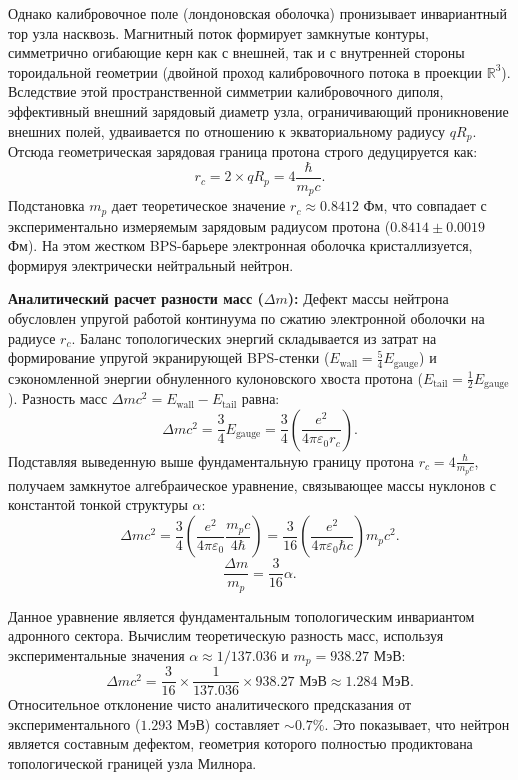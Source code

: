 \documentclass[11pt,a4paper]{article}
\begin{document}
	Однако калибровочное поле (лондоновская оболочка) пронизывает инвариантный тор узла насквозь. Магнитный поток формирует замкнутые контуры, симметрично огибающие керн как с внешней, так и с внутренней стороны тороидальной геометрии (двойной проход калибровочного потока в проекции $\mathbb{R}^3$). Вследствие этой пространственной симметрии калибровочного диполя, эффективный внешний зарядовый диаметр узла, ограничивающий проникновение внешних полей, удваивается по отношению к экваториальному радиусу $q R_p$.
	Отсюда геометрическая зарядовая граница протона строго дедуцируется как:
	\begin{equation}
		r_c = 2 \times q R_p = 4 \frac{\hbar}{m_p c}.
	\end{equation}
	Подстановка $m_p$ дает теоретическое значение $r_c \approx 0.8412$ Фм, что совпадает с экспериментально измеряемым зарядовым радиусом протона ($0.8414 \pm 0.0019$ Фм). На этом жестком BPS-барьере электронная оболочка кристаллизуется, формируя электрически нейтральный нейтрон.
	
	\textbf{Аналитический расчет разности масс ($\Delta m$):}
	Дефект массы нейтрона обусловлен упругой работой континуума по сжатию электронной оболочки на радиусе $r_c$. Баланс топологических энергий складывается из затрат на формирование упругой экранирующей BPS-стенки ($E_{\text{wall}} = \frac{5}{4} E_{\text{gauge}}$) и сэкономленной энергии обнуленного кулоновского хвоста протона ($E_{\text{tail}} = \frac{1}{2} E_{\text{gauge}}$).
	Разность масс $\Delta m c^2 = E_{\text{wall}} - E_{\text{tail}}$ равна:
	\begin{equation}
		\Delta m c^2 = \frac{3}{4} E_{\text{gauge}} = \frac{3}{4} \left( \frac{e^2}{4\pi\varepsilon_0 r_c} \right).
	\end{equation}
	Подставляя выведенную выше фундаментальную границу протона $r_c = 4 \frac{\hbar}{m_p c}$, получаем замкнутое алгебраическое уравнение, связывающее массы нуклонов с константой тонкой структуры $\alpha$:
	\begin{equation}
		\Delta m c^2 = \frac{3}{4} \left( \frac{e^2}{4\pi\varepsilon_0} \frac{m_p c}{4 \hbar} \right) = \frac{3}{16} \left( \frac{e^2}{4\pi\varepsilon_0 \hbar c} \right) m_p c^2.
	\end{equation}
	\begin{equation}
		\frac{\Delta m}{m_p} = \frac{3}{16} \alpha.
	\end{equation}
	
	Данное уравнение является фундаментальным топологическим инвариантом адронного сектора. Вычислим теоретическую разность масс, используя экспериментальные значения $\alpha \approx 1/137.036$ и $m_p = 938.27$ МэВ:
	\begin{equation}
		\Delta m c^2 = \frac{3}{16} \times \frac{1}{137.036} \times 938.27 \text{ МэВ} \approx \mathbf{1.284 \text{ МэВ}}.
	\end{equation}
	Относительное отклонение чисто аналитического предсказания от экспериментального ($1.293$ МэВ) составляет $\sim 0.7\%$. Это показывает, что нейтрон является составным дефектом, геометрия которого полностью продиктована топологической границей узла Милнора.
	
\end{document}
